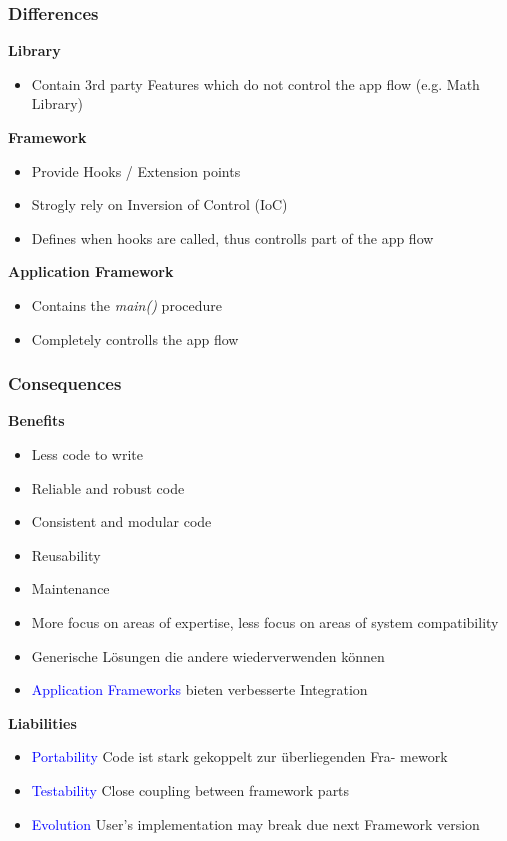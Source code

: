 \subsubsection{Differences}
\textbf{Library}
\begin{itemize}
    \item Contain 3rd party Features which do not control the app flow (e.g. Math Library)
\end{itemize}
\vspace{10pt}
\textbf{Framework}
\begin{itemize}
    \item Provide Hooks / Extension points
    \item Strogly rely on Inversion of Control (IoC)
    \item Defines when hooks are called, thus controlls part of the app flow
\end{itemize}
\vspace{10pt}
\textbf{Application Framework}
\begin{itemize}
    \item Contains the \textit{main()} procedure
    \item Completely controlls the app flow
\end{itemize}

\subsubsection{Consequences}

\textbf{Benefits}

\begin{itemize}
    \item Less code to write
    \item Reliable and robust code
    \item Consistent and modular code
    \item Reusability
    \item Maintenance
    \item More focus on areas of expertise, less focus on areas of system compatibility
    \item Generische Lösungen die andere wiederverwenden können
    \item \textcolor{blue}{Application Frameworks} bieten verbesserte Integration
\end{itemize}
\vspace{10pt}
\textbf{Liabilities}

\begin{itemize}
    \item \textcolor{blue}{Portability} Code ist stark gekoppelt zur überliegenden Fra-
    mework
    \item \textcolor{blue}{Testability} Close coupling between framework parts
    \item \textcolor{blue}{Evolution} User's implementation may break due next
    Framework version
\end{itemize}


